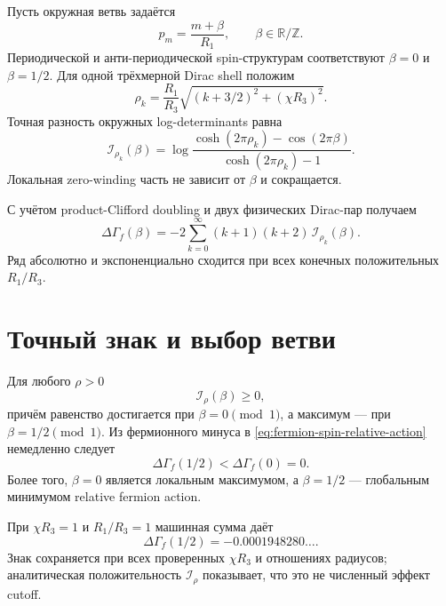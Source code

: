 Пусть окружная ветвь задаётся
\begin{equation}
 p_m=\frac{m+\beta}{R_1},
 \qquad
 \beta\in\mathbb R/\mathbb Z.
\end{equation}
Периодической и анти-периодической spin-структурам соответствуют
\(\beta=0\) и \(\beta=1/2\). Для одной трёхмерной Dirac shell положим
\begin{equation}
 \rho_k
 =\frac{R_1}{R_3}
 \sqrt{(k+3/2)^2+(\chi R_3)^2}.
\end{equation}
Точная разность окружных log-determinants равна
\begin{equation}
 \mathcal I_{\rho_k}(\beta)
 =\log
 \frac{\cosh(2\pi\rho_k)-\cos(2\pi\beta)}
 {\cosh(2\pi\rho_k)-1}.
\end{equation}
Локальная zero-winding часть не зависит от \(\beta\) и сокращается.

С учётом product-Clifford doubling и двух физических Dirac-пар получаем
\begin{equation}
 \Delta\Gamma_f(\beta)
 =-2\sum_{k=0}^{\infty}
 (k+1)(k+2)\,\mathcal I_{\rho_k}(\beta).
 \label{eq:fermion-spin-relative-action}
\end{equation}
Ряд абсолютно и экспоненциально сходится при всех конечных положительных
\(R_1/R_3\).

\section{Точный знак и выбор ветви}

Для любого \(\rho>0\)
\begin{equation}
 \mathcal I_\rho(\beta)\ge0,
\end{equation}
причём равенство достигается при \(\beta=0\pmod1\), а максимум --- при
\(\beta=1/2\pmod1\). Из фермионного минуса в
\eqref{eq:fermion-spin-relative-action} немедленно следует
\begin{equation}
 \Delta\Gamma_f(1/2)<\Delta\Gamma_f(0)=0.
\end{equation}
Более того, \(\beta=0\) является локальным максимумом, а
\(\beta=1/2\) --- глобальным минимумом relative fermion action.

При \(\chi R_3=1\) и \(R_1/R_3=1\) машинная сумма даёт
\begin{equation}
 \Delta\Gamma_f(1/2)
 =-0.0001948280\ldots.
\end{equation}
Знак сохраняется при всех проверенных \(\chi R_3\) и отношениях радиусов;
аналитическая положительность \(\mathcal I_\rho\) показывает, что это не
численный эффект cutoff.

